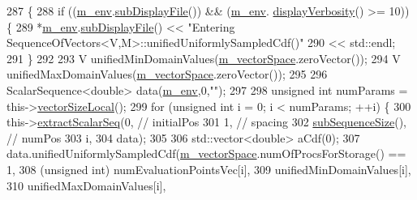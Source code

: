 \begin{DoxyCode}
287 \{
288   \textcolor{keywordflow}{if} ((\hyperlink{class_q_u_e_s_o_1_1_base_vector_sequence_a8e8824d2a63c5a43bcc6473e3a0491e8}{m\_env}.\hyperlink{class_q_u_e_s_o_1_1_base_environment_a8a0064746ae8dddfece4229b9ad374d6}{subDisplayFile}()) && (\hyperlink{class_q_u_e_s_o_1_1_base_vector_sequence_a8e8824d2a63c5a43bcc6473e3a0491e8}{m\_env}.
      \hyperlink{class_q_u_e_s_o_1_1_base_environment_a1fe5f244fc0316a0ab3e37463f108b96}{displayVerbosity}() >= 10)) \{
289     *\hyperlink{class_q_u_e_s_o_1_1_base_vector_sequence_a8e8824d2a63c5a43bcc6473e3a0491e8}{m\_env}.\hyperlink{class_q_u_e_s_o_1_1_base_environment_a8a0064746ae8dddfece4229b9ad374d6}{subDisplayFile}() << \textcolor{stringliteral}{"Entering
       SequenceOfVectors<V,M>::unifiedUniformlySampledCdf()"}
290                            << std::endl;
291   \}
292 
293   V unifiedMinDomainValues(\hyperlink{class_q_u_e_s_o_1_1_base_vector_sequence_a4bd171e39ed050ff105c808336f35198}{m\_vectorSpace}.zeroVector());
294   V unifiedMaxDomainValues(\hyperlink{class_q_u_e_s_o_1_1_base_vector_sequence_a4bd171e39ed050ff105c808336f35198}{m\_vectorSpace}.zeroVector());
295 
296   ScalarSequence<double> data(\hyperlink{class_q_u_e_s_o_1_1_base_vector_sequence_a8e8824d2a63c5a43bcc6473e3a0491e8}{m\_env},0,\textcolor{stringliteral}{""});
297 
298   \textcolor{keywordtype}{unsigned} \textcolor{keywordtype}{int} numParams = this->\hyperlink{class_q_u_e_s_o_1_1_base_vector_sequence_a2fefedf9e5b90f22881103b3f92555f6}{vectorSizeLocal}();
299   \textcolor{keywordflow}{for} (\textcolor{keywordtype}{unsigned} \textcolor{keywordtype}{int} i = 0; i < numParams; ++i) \{
300     this->\hyperlink{class_q_u_e_s_o_1_1_sequence_of_vectors_ac977b3b26a6af2ae727671f1246262fd}{extractScalarSeq}(0,                 \textcolor{comment}{// initialPos}
301                            1,                 \textcolor{comment}{// spacing}
302                            \hyperlink{class_q_u_e_s_o_1_1_sequence_of_vectors_a0224bd3e961d86af5d2886301c0c2b86}{subSequenceSize}(), \textcolor{comment}{// numPos}
303                            i,
304                            data);
305 
306     std::vector<double> aCdf(0);
307     data.unifiedUniformlySampledCdf(\hyperlink{class_q_u_e_s_o_1_1_base_vector_sequence_a4bd171e39ed050ff105c808336f35198}{m\_vectorSpace}.numOfProcsForStorage() == 1,
308                                     (\textcolor{keywordtype}{unsigned} int) numEvaluationPointsVec[i],
309                                     unifiedMinDomainValues[i],
310                                     unifiedMaxDomainValues[i],

\end{DoxyCode}
